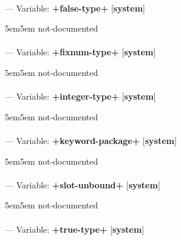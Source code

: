 \paragraph{}
\label{SYSTEM:+FALSE-TYPE+}
--- Variable: \textbf{+false-type+} [\textbf{system}] \textit{}

\begin{adjustwidth}{5em}{5em}
not-documented
\end{adjustwidth}

\paragraph{}
\label{SYSTEM:+FIXNUM-TYPE+}
--- Variable: \textbf{+fixnum-type+} [\textbf{system}] \textit{}

\begin{adjustwidth}{5em}{5em}
not-documented
\end{adjustwidth}

\paragraph{}
\label{SYSTEM:+INTEGER-TYPE+}
--- Variable: \textbf{+integer-type+} [\textbf{system}] \textit{}

\begin{adjustwidth}{5em}{5em}
not-documented
\end{adjustwidth}

\paragraph{}
\label{SYSTEM:+KEYWORD-PACKAGE+}
--- Variable: \textbf{+keyword-package+} [\textbf{system}] \textit{}

\begin{adjustwidth}{5em}{5em}
not-documented
\end{adjustwidth}

\paragraph{}
\label{SYSTEM:+SLOT-UNBOUND+}
--- Variable: \textbf{+slot-unbound+} [\textbf{system}] \textit{}

\begin{adjustwidth}{5em}{5em}
not-documented
\end{adjustwidth}

\paragraph{}
\label{SYSTEM:+TRUE-TYPE+}
--- Variable: \textbf{+true-type+} [\textbf{system}] \textit{}

